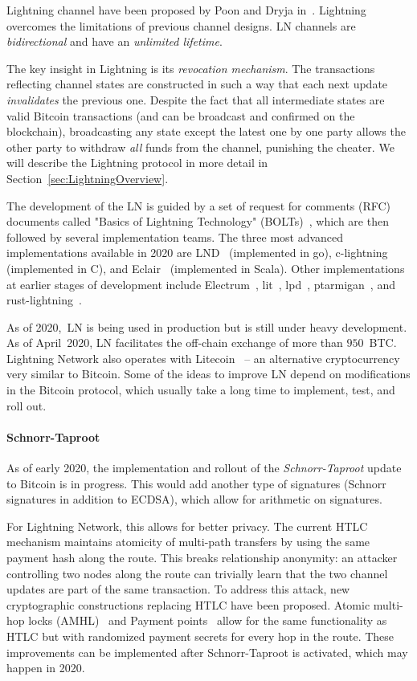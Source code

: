 Lightning channel have been proposed by Poon and Dryja in~\cite{Poon2016}.
Lightning overcomes the limitations of previous channel designs.
LN channels are \textit{bidirectional} and have an \textit{unlimited lifetime}.

The key insight in Lightning is its \textit{revocation mechanism}.
The transactions reflecting channel states are constructed in such a way that each next update \textit{invalidates} the previous one.
Despite the fact that all intermediate states are valid Bitcoin transactions (and can be broadcast and confirmed on the blockchain), broadcasting any state except the latest one by one party allows the other party to withdraw \textit{all} funds from the channel, punishing the cheater.
We will describe the Lightning protocol in more detail in Section~\ref{sec:LightningOverview}.

The development of the LN is guided by a set of request for comments (RFC) documents called "Basics of Lightning Technology" (BOLTs)~\cite{BOLT}, 
which are then followed by several implementation teams.
The three most advanced implementations available in 2020 are LND~\cite{LND} (implemented in go), c-lightning~\cite{clightning} (implemented in C), and Eclair~\cite{Eclair} (implemented in Scala).
Other implementations at earlier stages of development include
Electrum~\cite{ElectrumWebsite, ElectrumLightningAnnounce}, lit~\cite{lit}, lpd~\cite{lpd}, ptarmigan~\cite{ptarmigan}, and rust-lightning~\cite{rustlightning}.

As of 2020,~LN is being used in production but is still under heavy development.
As of April~2020, LN facilitates the off-chain exchange of more than $950$~BTC.
Lightning Network also operates with Litecoin~\cite{1MLLitecoin} -- an alternative cryptocurrency very similar to Bitcoin.
Some of the ideas to improve LN depend on modifications in the Bitcoin protocol, which usually take a long time to implement, test, and roll out.

\paragraph{Schnorr-Taproot}
As of early 2020, the implementation and rollout of the \textit{Schnorr-Taproot} update to Bitcoin is in progress.
This would add another type of signatures (Schnorr signatures in addition to ECDSA), which allow for arithmetic on signatures.

For Lightning Network, this allows for better privacy.
The current HTLC mechanism maintains atomicity of multi-path transfers by using the same payment hash along the route.
This breaks relationship anonymity: an attacker controlling two nodes along the route can trivially learn that the two channel updates are part of the same transaction.
To address this attack, new cryptographic constructions replacing HTLC have been proposed.
Atomic multi-hop locks (AMHL)~\cite{Malavolta2019} and Payment points~\cite{Kohen2019} allow for the same functionality as HTLC but with randomized payment secrets for every hop in the route.
These improvements can be implemented after Schnorr-Taproot is activated, which may happen in 2020.

